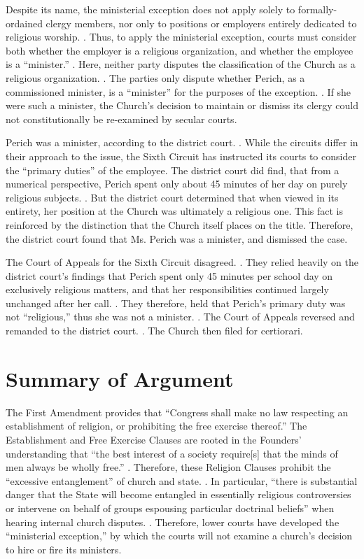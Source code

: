 \documentclass[12pt,\documentclassflag]{michiganCourtOfAppealsBrief}
\begin{document}
Despite its name, the ministerial exception does not apply solely to formally-ordained clergy members, nor only to positions or employers entirely dedicated to religious worship. . Thus, to apply the ministerial exception, courts must consider both whether the employer is a religious organization, and whether the employee is a ``minister.'' . Here, neither party disputes the classification of the Church as a religious organization. . The parties only dispute whether Perich, as a commissioned minister, is a ``minister'' for the purposes of the exception. . If she were such a minister, the Church's decision to maintain or dismiss its clergy could not constitutionally be re-examined by secular courts. 

Perich was a minister, according to the district court. . While the circuits differ in their approach to the issue, the Sixth Circuit has instructed its courts to consider the ``primary duties'' of the employee. The district court did find, that from a numerical perspective, Perich spent only about 45 minutes of her day on purely religious subjects. . But the district court determined that when viewed in its entirety, her position at the Church was ultimately a religious one. This fact is reinforced by the distinction that the Church itself places on the title. Therefore, the district court found that Ms. Perich was a minister, and dismissed the case.

The Court of Appeals for the Sixth Circuit disagreed. \See {}. They relied heavily on the district court's findings that Perich spent only 45 minutes per school day on exclusively religious matters, and that her responsibilities continued largely unchanged after her call. . They therefore, held that Perich's primary duty was not ``religious,'' thus she was not a minister. . The Court of Appeals reversed and remanded to the district court. . The Church then filed for certiorari. 

\section{Summary of Argument}

The First Amendment provides that ``Congress shall make no law respecting an establishment of religion, or prohibiting the free exercise thereof.'' The Establishment and Free Exercise Clauses are rooted in the Founders' understanding that ``the best interest of a society require[s] that the minds of men always be wholly free.'' . Therefore, these Religion Clauses prohibit the ``excessive entanglement'' of church and state.  \See {}. In particular, ``there is substantial danger that the State will become entangled in essentially religious controversies or intervene on behalf of groups espousing particular doctrinal beliefs'' when hearing internal church disputes. . Therefore, lower courts have developed the ``ministerial exception,'' by which the courts will not examine a church's decision to hire or fire its ministers.  
\end{document}
